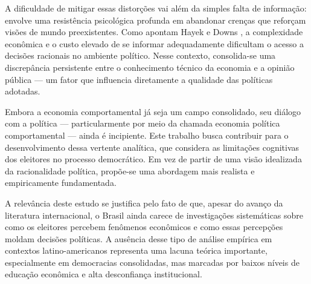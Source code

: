 A dificuldade de mitigar essas distorções vai além da simples falta de informação: envolve uma resistência psicológica profunda em abandonar crenças que reforçam visões de mundo preexistentes. Como apontam Hayek \citeyear{hayek_knowledge_use} e Downs \citeyear{downs1957economic}, a complexidade econômica e o custo elevado de se informar adequadamente dificultam o acesso a decisões racionais no ambiente político. Nesse contexto, consolida-se uma discrepância persistente entre o conhecimento técnico da economia e a opinião pública — um fator que influencia diretamente a qualidade das políticas adotadas.

Embora a economia comportamental já seja um campo consolidado, seu diálogo com a política — particularmente por meio da chamada economia política comportamental — ainda é incipiente. Este trabalho busca contribuir para o desenvolvimento dessa vertente analítica, que considera as limitações cognitivas dos eleitores no processo democrático. Em vez de partir de uma visão idealizada da racionalidade política, propõe-se uma abordagem mais realista e empiricamente fundamentada.

A relevância deste estudo se justifica pelo fato de que, apesar do avanço da literatura internacional, o Brasil ainda carece de investigações sistemáticas sobre como os eleitores percebem fenômenos econômicos e como essas percepções moldam decisões políticas. A ausência desse tipo de análise empírica em contextos latino-americanos representa uma lacuna teórica importante, especialmente em democracias consolidadas, mas marcadas por baixos níveis de educação econômica e alta desconfiança institucional.




